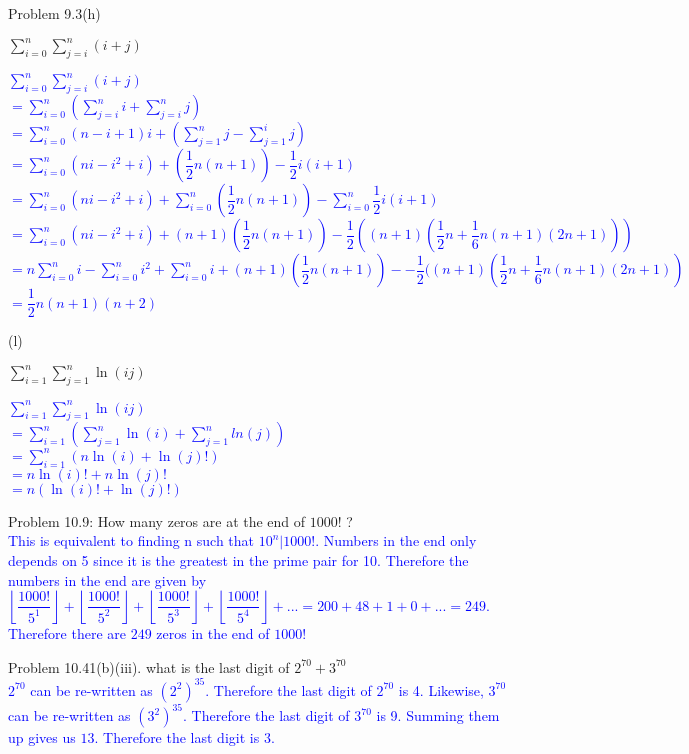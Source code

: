 \documentclass{article}
\begin{document}
\begin{addmargin}[2em]{2em}
	Problem 9.3(h)
	\begin{center}
		$\sum_{i=0}^{n} \sum_{j=i}^{n}(i+j)$
	\end{center} 
	\noindent
	\textcolor{blue}{
	$\sum_{i=0}^{n} \sum_{j=i}^{n}(i+j)$\\
	$=\sum_{i=0}^{n} (\sum_{j=i}^{n} i + \sum_{j=i}^{n} j)$\\
	$=\sum_{i=0}^{n}(n-i+1)i+(\sum_{j=1}^{n}j - \sum_{j=1}^{i}j)$\\
	$=\sum_{i=0}^{n}(ni-i^2+i)+(\dfrac{1}{2}n(n+1))-\dfrac{1}{2}i(i+1)$\\
	$=\sum_{i=0}^{n}(ni-i^2+i)+\sum_{i=0}^{n}(\dfrac{1}{2}n(n+1))-\sum_{i=0}^{n}\dfrac{1}{2}i(i+1)$\\
	$=\sum_{i=0}^{n}(ni-i^2+i)+(n+1)(\dfrac{1}{2}n(n+1))-\dfrac{1}{2}((n+1)(\dfrac{1}{2}n+\dfrac{1}{6}n(n+1)(2n+1)))$\\
	$=n\sum_{i=0}^{n}i-\sum_{i=0}^{n}i^2+\sum_{i=0}^{n}i+(n+1)(\dfrac{1}{2}n(n+1))--\dfrac{1}{2}((n+1)(\dfrac{1}{2}n+\dfrac{1}{6}n(n+1)(2n+1))$\\
	$=\dfrac{1}{2}n(n+1)(n+2)$\\
	}
	
	(l)
	\begin{center}
		$\sum_{i=1}^{n} \sum_{j=1}^{n}\ln{(ij)}$
	\end{center} 
	\noindent
	\textcolor{blue}{
		$\sum_{i=1}^{n} \sum_{j=1}^{n}\ln{(ij)}$\\
		$=\sum_{i=1}^{n} (\sum_{j=1}^{n}\ln{(i)}+\sum_{j=1}^{n}ln(j))$\\
		$=\sum_{i=1}^{n} (n \ln(i) + \ln(j)!)$\\
		$=n\ln(i)!+n\ln(j)!$\\
		$=n(\ln(i)!+\ln(j)!)$
	}
\end{addmargin}

\newpage
\begin{addmargin}[2em]{2em}
	Problem 10.9: How many zeros are at the end of $1000!$ ?\\
	\textcolor{blue}{
	\indent This is equivalent to finding n such that $10^n|1000!$. Numbers in the end only depends on 5 since it is the greatest in the prime pair for 10. Therefore the numbers in the end are given by $\left \lfloor\dfrac{1000!}{5^1}\right \rfloor+\left \lfloor\dfrac{1000!}{5^2}\right \rfloor+\left \lfloor\dfrac{1000!}{5^3}\right \rfloor+\left \lfloor\dfrac{1000!}{5^4}\right \rfloor+...= 200+48 +1 +0+...=249$. Therefore there are $249$ zeros in the end of $1000!$}
\end{addmargin}

\newpage
\begin{addmargin}[2em]{2em}
	Problem 10.41(b)(iii). what is the last digit of $2^{70} + 3^{70}$\\
	\indent
	\textcolor{blue}{$2^{70}$ can be re-written as $(2^2)^{35}$. Therefore the last digit of $2^{70}$ is 4. Likewise, $3^{70}$ can be re-written as $(3^2)^{35}$. Therefore the last digit of $3^{70}$ is 9. Summing them up gives us $13$. Therefore the last digit is $3$.}
\end{addmargin}
\end{document}
